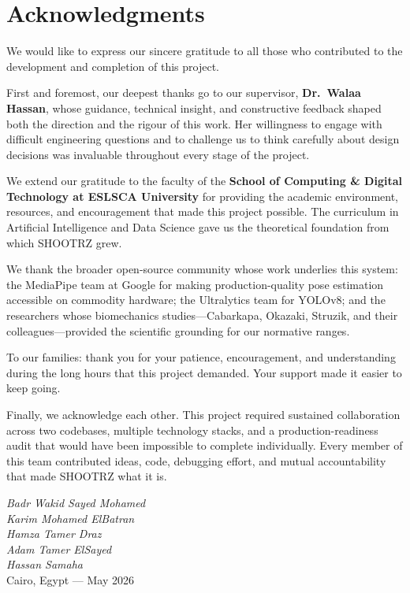 \chapter*{Acknowledgments}

We would like to express our sincere gratitude to all those who contributed to the development and completion of this project.

First and foremost, our deepest thanks go to our supervisor, \textbf{Dr.\ Walaa Hassan}, whose guidance, technical insight, and constructive feedback shaped both the direction and the rigour of this work. Her willingness to engage with difficult engineering questions and to challenge us to think carefully about design decisions was invaluable throughout every stage of the project.

We extend our gratitude to the faculty of the \textbf{School of Computing \& Digital Technology at ESLSCA University} for providing the academic environment, resources, and encouragement that made this project possible. The curriculum in Artificial Intelligence and Data Science gave us the theoretical foundation from which SHOOTRZ grew.

We thank the broader open-source community whose work underlies this system: the MediaPipe team at Google for making production-quality pose estimation accessible on commodity hardware; the Ultralytics team for YOLOv8; and the researchers whose biomechanics studies---Cabarkapa, Okazaki, Struzik, and their colleagues---provided the scientific grounding for our normative ranges.

To our families: thank you for your patience, encouragement, and understanding during the long hours that this project demanded. Your support made it easier to keep going.

Finally, we acknowledge each other. This project required sustained collaboration across two codebases, multiple technology stacks, and a production-readiness audit that would have been impossible to complete individually. Every member of this team contributed ideas, code, debugging effort, and mutual accountability that made SHOOTRZ what it is.

\par\bigskip
\noindent\begin{minipage}{\textwidth}
  \begin{flushright}
    \textit{Badr Wakid Sayed Mohamed} \\
    \textit{Karim Mohamed ElBatran} \\
    \textit{Hamza Tamer Draz} \\
    \textit{Adam Tamer ElSayed} \\
    \textit{Hassan Samaha} \\[0.5em]
    Cairo, Egypt --- May 2026
  \end{flushright}
\end{minipage}

\clearpage
